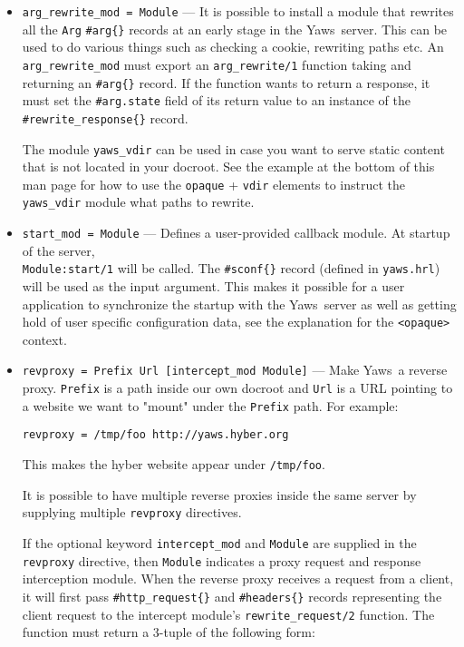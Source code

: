 \documentclass[11pt,oneside,english]{book}
\newcommand{\Yaws}            %
        {{\sc Yaws}}
\begin{document}
\begin{itemize}
\item       \verb+arg_rewrite_mod = Module+ ---
              It is possible to install a module that rewrites all the
              \verb+Arg+ \verb+#arg{}+ records at an early stage in the
              \Yaws\ server.  This can be used to do various things such as
              checking a cookie, rewriting paths etc. An
              \verb+arg_rewrite_mod+ must export an \verb+arg_rewrite/1+
              function taking and returning an \verb+#arg{}+ record. If the
              function wants to return a response, it must set the
              \verb+#arg.state+ field of its return value to an instance of
              the \verb+#rewrite_response{}+ record.

              The module \verb+yaws_vdir+ can be used in case you want to serve
              static content that is not located in your docroot. See the
              example at the bottom of this man page for how to use the
              \verb+opaque+ + \verb+vdir+ elements to instruct the
              \verb+yaws_vdir+ module what paths to rewrite.

\item       \verb+start_mod = Module+ ---
              Defines a user-provided callback module. At startup of the server,\\
              \verb+Module:start/1+ will be called.  The \verb+#sconf{}+ record
              (defined in \verb+yaws.hrl+) will be used as the input argument. This
              makes it possible for a user application to synchronize the
              startup with the \Yaws\ server as well as getting hold of user
              specific configuration data, see the explanation for the
              \verb+<opaque>+ context.

\item       \verb+revproxy = Prefix Url [intercept_mod Module]+ ---
              Make \Yaws\ a reverse proxy. \verb+Prefix+ is a path inside our own
              docroot and \verb+Url+ is a URL pointing to a website we
              want to "mount" under the \verb+Prefix+ path. For example:

              \verb+revproxy = /tmp/foo http://yaws.hyber.org+

              This makes the hyber website appear under \verb+/tmp/foo+.

              It is possible to have multiple reverse proxies inside the same
              server by supplying multiple \verb+revproxy+ directives.

              If the optional keyword \verb+intercept_mod+ and
              \verb+Module+ are supplied in the \verb+revproxy+ directive,
              then \verb+Module+ indicates a proxy request and response
              interception module. When the reverse proxy receives a
              request from a client, it will first pass
              \verb+#http_request{}+ and \verb+#headers{}+ records
              representing the client request to the intercept module's
              \verb+rewrite_request/2+ function. The function must return a
              3-tuple of the following form:


\end{itemize}
\end{document}
